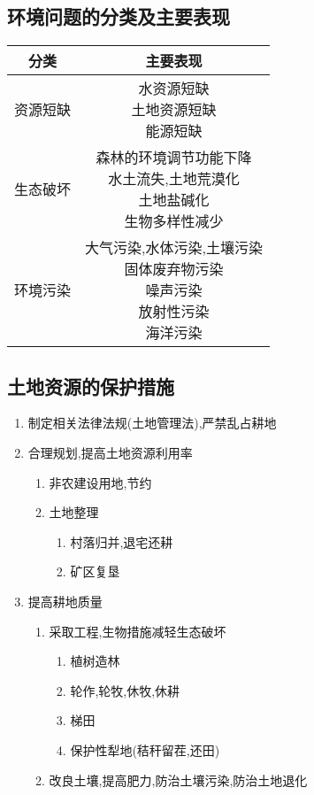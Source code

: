 \documentclass[a4paper]{article}
\begin{document}
    \subsection{环境问题的分类及主要表现}
        \begin{tabular}{|c|c|}
            \hline
            分类    &   主要表现    \\
            \hline
            资源短缺    &   \makecell[c]{水资源短缺\\土地资源短缺\\能源短缺}  \\
            \hline
            生态破坏    &   \makecell[c]{森林的环境调节功能下降\\水土流失,土地荒漠化\\土地盐碱化\\生物多样性减少}   \\
            \hline
            环境污染    &   \makecell[c]{大气污染,水体污染,土壤污染\\固体废弃物污染\\噪声污染\\放射性污染\\海洋污染}  \\
            \hline
        \end{tabular}
    \subsection{土地资源的保护措施}
    \begin{enumerate}
        \item 制定相关法律法规(土地管理法),严禁乱占耕地
        \item 合理规划,提高土地资源利用率
        \begin{enumerate}
            \item 非农建设用地,节约
            \item 土地整理
            \begin{enumerate}
                \item 村落归并,退宅还耕
                \item 矿区复垦
            \end{enumerate}
        \end{enumerate}
        \item 提高耕地质量
        \begin{enumerate}
            \item 采取工程,生物措施减轻生态破坏
            \begin{enumerate}
                \item 植树造林
                \item 轮作,轮牧,休牧,休耕
                \item 梯田
                \item 保护性犁地(秸秆留茬,还田)
            \end{enumerate}
            \item 改良土壤,提高肥力,防治土壤污染,防治土地退化
        \end{enumerate}
    \end{enumerate}
\end{document}
